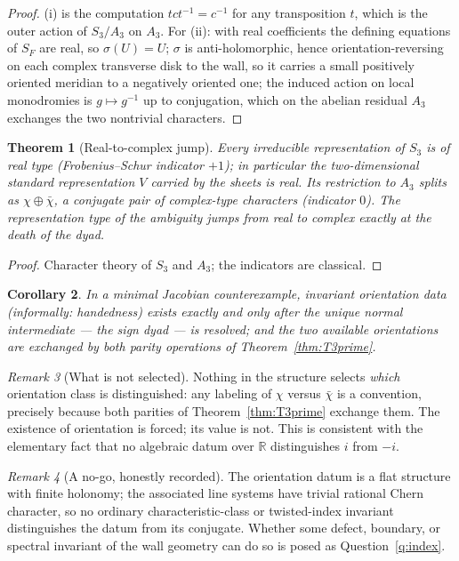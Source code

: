 \documentclass[11pt,reqno]{amsart}
\numberwithin{equation}{section}
\newtheorem{theorem}{Theorem}[section]
\newtheorem{corollary}[theorem]{Corollary}
\theoremstyle{remark}
\newtheorem{remark}[theorem]{Remark}
\newcommand{\R}{\mathbb R}
\newcommand{\SF}{S_F}
\begin{document}
\begin{proof}
(i) is the computation $tct^{-1}=c^{-1}$ for any transposition $t$, which
is the outer action of $S_3/A_3$ on $A_3$. For (ii): with real
coefficients the defining equations of $\SF$ are real, so $\sigma(U)=U$;
$\sigma$ is anti-holomorphic, hence orientation-reversing on each complex
transverse disk to the wall, so it carries a small positively oriented
meridian to a negatively oriented one; the induced action on local
monodromies is $g\mapsto g^{-1}$ up to conjugation, which on the abelian
residual $A_3$ exchanges the two nontrivial characters.
\end{proof}

\begin{theorem}[Real-to-complex jump]\label{thm:T4}
Every irreducible representation of $S_3$ is of real type
\textup{(}Frobenius--Schur indicator $+1$\textup{)}; in particular the
two-dimensional standard representation $V$ carried by the sheets is real.
Its restriction to $A_3$ splits as $\chi\oplus\bar\chi$, a conjugate pair
of complex-type characters \textup{(}indicator $0$\textup{)}. The
representation type of the ambiguity jumps from real to complex exactly at
the death of the dyad.
\end{theorem}

\begin{proof}
Character theory of $S_3$ and $A_3$; the indicators are classical.
\end{proof}

\begin{corollary}\label{cor:slogan}
In a minimal Jacobian counterexample, invariant orientation data
\textup{(}informally: handedness\textup{)} exists exactly and only after
the unique normal intermediate --- the sign dyad --- is resolved; and the
two available orientations are exchanged by both parity operations of
Theorem~\ref{thm:T3prime}.
\end{corollary}

\begin{remark}[What is not selected]\label{rem:grace}
Nothing in the structure selects \emph{which} orientation class is
distinguished: any labeling of $\chi$ versus $\bar\chi$ is a convention,
precisely because both parities of Theorem~\ref{thm:T3prime} exchange them.
The existence of orientation is forced; its value is not. This is
consistent with the elementary fact that no algebraic datum over $\R$
distinguishes $i$ from $-i$.
\end{remark}

\begin{remark}[A no-go, honestly recorded]\label{rem:nogo}
The orientation datum is a flat structure with finite holonomy; the
associated line systems have trivial rational Chern character, so no
ordinary characteristic-class or twisted-index invariant distinguishes the
datum from its conjugate. Whether some defect, boundary, or spectral
invariant of the wall geometry can do so is posed as
Question~\ref{q:index}.
\end{remark}
\end{document}
